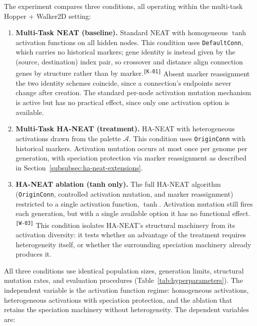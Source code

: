 \documentclass[12pt]{article}
\newcommand{\revID}[1]{\textsuperscript{\scriptsize\texttt{[#1]}}}
\newcommand{\revWrong}[2]{\textcolor{revRed}{#2}\revID{#1}}
\newcommand{\revConsistency}[2]{\textcolor{revBlue}{#2}\revID{#1}}
\begin{document}
The experiment compares three conditions, all operating within the multi-task Hopper + Walker2D setting:

\begin{enumerate}
    \item \textbf{Multi-Task NEAT (baseline).} Standard NEAT with homogeneous $\tanh$ activation functions on all hidden nodes. \revConsistency{K-01}{This condition uses \texttt{DefaultConn}, which carries no historical markers; gene identity is instead given by the (source, destination) index pair, so crossover and distance align connection genes by structure rather than by marker.} Absent marker reassignment the two identity schemes coincide, since a connection's endpoints never change after creation. The standard per-node activation mutation mechanism is active but has no practical effect, since only one activation option is available.

    \item \textbf{Multi-Task HA-NEAT (treatment).} HA-NEAT with heterogeneous activations drawn from the palette $\mathcal{A}$. This condition uses \texttt{OriginConn} with historical markers. Activation mutation occurs at most once per genome per generation, with speciation protection via marker reassignment as described in Section~\ref{subsubsec:ha-neat-extensions}.

    \item \textbf{HA-NEAT ablation (tanh only).} The full HA-NEAT algorithm (\texttt{OriginConn}, controlled activation mutation, and marker reassignment) restricted to a single activation function, $\tanh$. \revWrong{W-03}{Activation mutation still fires each generation, but with a single available option it has no functional effect.} This condition isolates HA-NEAT's structural machinery from its activation diversity: it tests whether an advantage of the treatment requires heterogeneity itself, or whether the surrounding speciation machinery already produces it.
\end{enumerate}

All three conditions use identical population sizes, generation limits, structural mutation rates, and evaluation procedures (Table~\ref{tab:hyperparameters}).
The independent variable is the activation function regime: homogeneous activations, heterogeneous activations with speciation protection, and the ablation that retains the speciation machinery without heterogeneity.
The dependent variables are:
\end{document}
